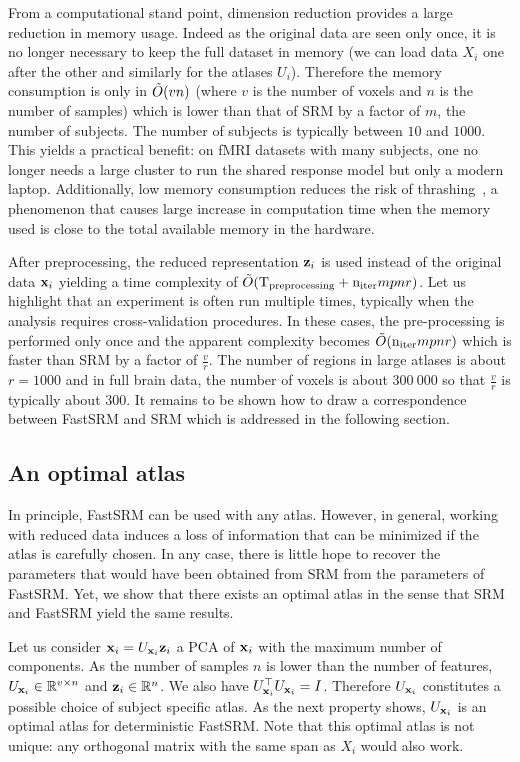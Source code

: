 \documentclass{article}
\newcommand{\bt}[1]{\todo[color=orange, inline=True]{BT: #1}}
\begin{document}
From a computational stand point, dimension reduction provides
a large reduction in memory usage.
%
Indeed as the original data are seen only
once, it is no longer necessary to keep the full dataset in memory (we can load
data $X_i$ one after the other and similarly for the atlases $U_i$).
%
Therefore
the memory consumption is only in $\tilde{O}(vn)$ (where $v$ is the number of voxels
and $n$ is the number of samples) which is lower than that of SRM by a factor of $m$,
the number of subjects.
%
The number of subjects is typically between $10$ and
$1000$.
%
This yields a practical benefit: on fMRI datasets with many subjects, one no
longer needs a large cluster to run the shared response model but only a modern
laptop.
%
Additionally, low memory consumption reduces the
risk of thrashing~\cite{denning1968thrashing}, a phenomenon that causes large
increase in computation time when the memory used is close to the total available
memory in the hardware.
%


After preprocessing, the reduced representation $\mathbf{z}_i$ is used instead of the
original data $\mathbf{x}_i$ yielding a time complexity of $\tilde{O}(
\mathrm{T_{preprocessing}} + \mathrm{n_{iter}} mpnr)$.
%
Let us highlight that an experiment is often run multiple times,
typically when the analysis requires cross-validation procedures.
%
In these cases,
the pre-processing is performed only once and the apparent complexity becomes
$\tilde{O}(\mathrm{n_{iter}} mpnr)$ which is faster than SRM by
a factor of $\frac{v}{r}$.
%
The number of regions in large atlases is about $r=1000$ and in full brain data,
the number of voxels is about $300~000$ so that $\frac{v}{r}$ is typically about
$300$.
%
It remains to be shown how to draw a correspondence between FastSRM and SRM which is
addressed in the following section.
%


\subsection{An optimal atlas}
\label{sec:optimal_atlas}
In principle, FastSRM can be used with any atlas.
%
However, in general, working with reduced data induces a loss of information
that can be minimized if the atlas is carefully chosen.
%
In any case, there is little hope to recover the parameters that would have been
obtained from SRM from the parameters of FastSRM.
%
Yet, we show that there exists an optimal atlas in the
sense that SRM and FastSRM yield the same results.


Let us consider $\mathbf{x}_i = U_{\mathbf{x}_i} \mathbf{z}_i$
%
%
a PCA of $\mathbf{x}_i$ with the maximum
number of components.
%
As the number of
samples $n$ is lower than the number of features, $U_{\mathbf{x}_i} \in \mathbb{R}^{v \times
  n}$ and $\mathbf{z}_i \in \mathbb{R}^{n}$.
%
We also have $U_{\mathbf{x}_i}^{\top}U_{\mathbf{x}_i} = I$.
%
Therefore $U_{\mathbf{x}_i}$ constitutes a possible choice of subject specific atlas.
%
As the next property shows, $U_{\mathbf{x}_i}$ is an optimal atlas for deterministic
FastSRM. Note that this optimal atlas is not unique: any orthogonal matrix with
the same span as $X_i$ would also work.
%
\end{document}
